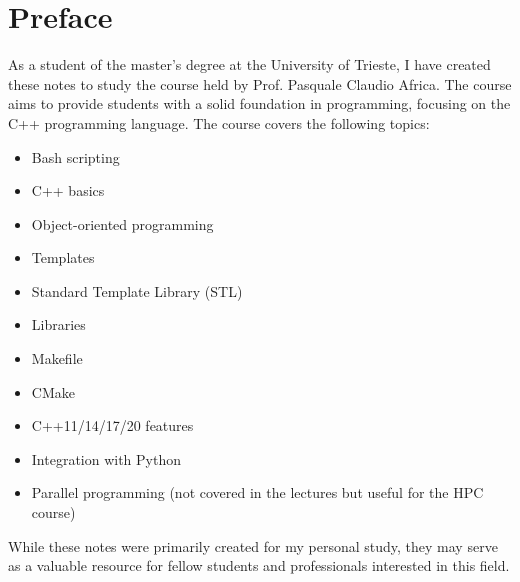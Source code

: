 
\chapter*{Preface}

As a student of the  master's degree at the University of Trieste, I have created these notes to study the course  held by Prof. Pasquale Claudio Africa. The course aims to provide students with a solid foundation in programming, focusing on the C++ programming language. The course covers the following topics:
\begin{itemize}
    \item Bash scripting
    \item C++ basics
    \item Object-oriented programming
    \item Templates
    \item Standard Template Library (STL)
    \item Libraries
    \item Makefile
    \item CMake
    \item C++11/14/17/20 features
    \item Integration with Python
    \item Parallel programming (not covered in the lectures but useful for the HPC course)
\end{itemize}
While these notes were primarily created for my personal study, they may serve as a valuable resource for fellow students and professionals interested in this field.

